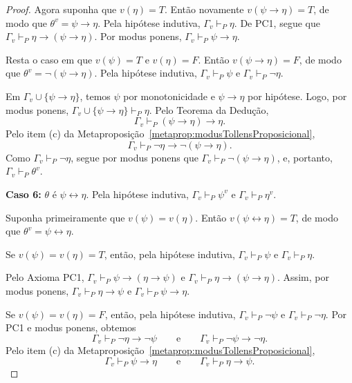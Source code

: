 \begin{proof}
    Agora suponha que $v(\eta)=T$.
    Então novamente $v(\psi\rightarrow\eta)=T$, de modo que $\theta^v=\psi\rightarrow\eta$.
    Pela hipótese indutiva, $\Gamma_v\vdash_P \eta$.
    De PC1, segue que $\Gamma_v\vdash_P \eta\rightarrow (\psi\rightarrow\eta)$.
    Por modus ponens, $\Gamma_v\vdash_P \psi\rightarrow\eta$.
    
    Resta o caso em que $v(\psi)=T$ e $v(\eta)=F$.
    Então $v(\psi\rightarrow\eta)=F$, de modo que $\theta^v=\neg(\psi\rightarrow\eta)$.
    Pela hipótese indutiva, $\Gamma_v\vdash_P \psi$
    e $\Gamma_v\vdash_P \neg\eta$.

    Em $\Gamma_v\cup\{\psi\rightarrow \eta\}$, temos $\psi$ por monotonicidade e $\psi\rightarrow\eta$ por hipótese.
    Logo, por modus ponens, $\Gamma_v\cup\{\psi\rightarrow \eta\}\vdash_P \eta$.
    Pelo Teorema da Dedução,
    \[
        \Gamma_v\vdash_P (\psi\rightarrow\eta)\rightarrow\eta.
    \]
    Pelo item (c) da Metaproposição~\ref{metaprop:modusTollensProposicional},
    \[
        \Gamma_v\vdash_P \neg\eta\rightarrow\neg(\psi\rightarrow\eta).
    \]
    Como $\Gamma_v\vdash_P \neg\eta$, segue por modus ponens que $\Gamma_v\vdash_P \neg(\psi\rightarrow\eta)$, e, portanto, $\Gamma_v\vdash_P \theta^v$.
     
    \textbf{Caso 6:} $\theta$ é $\psi\leftrightarrow\eta$.
    Pela hipótese indutiva, $\Gamma_v\vdash_P \psi^v$ e $\Gamma_v\vdash_P \eta^v$.

    Suponha primeiramente que $v(\psi)=v(\eta)$.
    Então $v(\psi\leftrightarrow\eta)=T$, de modo que $\theta^v=\psi\leftrightarrow\eta$.

    Se $v(\psi)=v(\eta)=T$, então, pela hipótese indutiva, $\Gamma_v\vdash_P \psi$ e $\Gamma_v\vdash_P \eta$.

    Pelo Axioma PC1, $\Gamma_v\vdash_P \psi\rightarrow (\eta\rightarrow \psi)$ e $\Gamma_v\vdash_P \eta\rightarrow (\psi\rightarrow \eta)$.
    Assim, por modus ponens, $\Gamma_v\vdash_P \eta\rightarrow \psi$ e $\Gamma_v\vdash_P \psi\rightarrow \eta$.
    
    Se $v(\psi)=v(\eta)=F$, então, pela hipótese indutiva, $\Gamma_v\vdash_P \neg\psi$ e $\Gamma_v\vdash_P \neg\eta$.
    Por PC1 e modus ponens, obtemos
    \[
        \Gamma_v\vdash_P \neg\eta\rightarrow\neg\psi
        \qquad\text{e}\qquad
        \Gamma_v\vdash_P \neg\psi\rightarrow\neg\eta.
    \]
    Pelo item (c) da Metaproposição~\ref{metaprop:modusTollensProposicional},
    \[
        \Gamma_v\vdash_P \psi\rightarrow\eta
        \qquad\text{e}\qquad
        \Gamma_v\vdash_P \eta\rightarrow\psi.
    \]


\end{proof}
